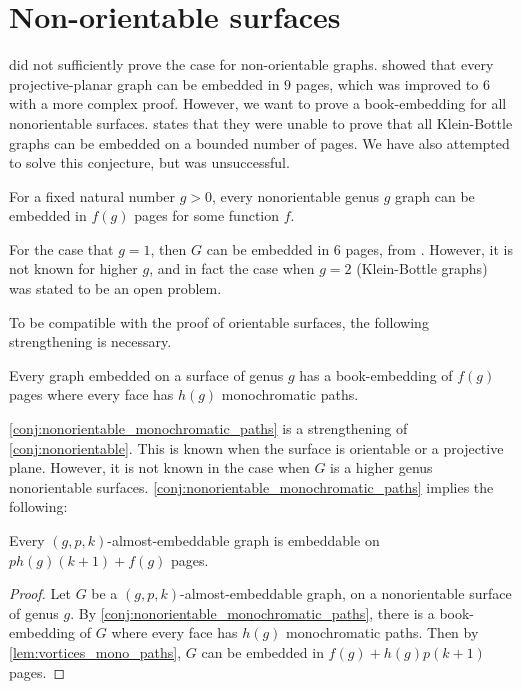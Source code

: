 
\section{Non-orientable surfaces}

\textcite{heathEmbeddingPlanarGraphs1984} did not sufficiently prove the case for non-orientable graphs. \textcite{nakamotoBookEmbeddingProjectiveplanar2015} showed that every projective-planar graph can be embedded in $9$ pages, which was improved to 6 with a more complex proof. However, we want to prove a book-embedding for all nonorientable surfaces. 
\textcite{ozekiBookEmbeddingGraphs2019} states that they were unable to prove that all Klein-Bottle graphs can be embedded on a bounded number of pages. We have also attempted to solve this conjecture, but was unsuccessful. 

\begin{conjecture}\label{conj:nonorientable}
	For a fixed natural number $g > 0$, every nonorientable genus $g$ graph can be embedded in $f(g)$ pages for some function $f$. 
\end{conjecture}

For the case that $g = 1$, then $G$ can be embedded in 6 pages, from \textcite{ozekiBookEmbeddingGraphs2019}. However, it is not known for higher $g$, and in fact the case when $g = 2$ (Klein-Bottle graphs) was stated to be an open problem. 

To be compatible with the proof of orientable surfaces, the following strengthening is necessary. 
\begin{conjecture}\label{conj:nonorientable_monochromatic_paths}
	Every graph embedded on a surface of genus $g$ has a book-embedding of $f(g)$ pages where every face has $h(g)$ monochromatic paths. 
\end{conjecture}

\cref{conj:nonorientable_monochromatic_paths} is a strengthening of \cref{conj:nonorientable}. This is known when the surface is orientable or a projective plane. However, it is not known in the case when $G$ is a higher genus nonorientable surfaces.
\cref{conj:nonorientable_monochromatic_paths} implies the following:

\begin{corollary}
	Every $(g, p, k)$-almost-embeddable graph is embeddable on $p h(g) (k + 1) + f(g)$ pages.
\end{corollary}

\begin{proof}
	Let $G$ be a $(g, p, k)$-almost-embeddable graph, on a nonorientable surface of genus $g$. By \cref{conj:nonorientable_monochromatic_paths}, there is a book-embedding of $G$ where every face has $h(g)$ monochromatic paths. Then by \cref{lem:vortices_mono_paths}, $G$ can be embedded in $f(g) + h(g) p (k+1)$ pages. 
\end{proof}

